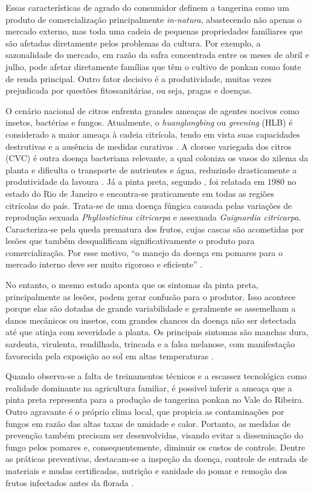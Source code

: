 Essas características de agrado do consumidor definem a tangerina como um produto de comercialização principalmente \emph{in-natura}, abastecendo não apenas o mercado externo, mas toda uma cadeia de pequenas propriedades familiares que são afetadas diretamente pelos problemas da cultura. Por exemplo, a sazonalidade do mercado, em razão da safra concentrada entre os meses de abril e julho, pode afetar diretamente famílias que têm o cultivo de ponkan como fonte de renda principal. Outro fator decisivo é a produtividade, muitas vezes prejudicada por questões fitossanitárias, ou seja, pragas e doenças. 

O cenário nacional de citros enfrenta grandes ameaças de agentes nocivos como insetos, bactérias e fungos. Atualmente, o \emph{huanglongbing} ou \emph{greening} (HLB) é considerado a maior ameaça à cadeia citrícola, tendo em vista suas capacidades destrutivas e a ausência de medidas curativas \cite{rodrigues2016hlb}. A clorose variegada dos citros (CVC) é outra doença bacteriana relevante, a qual coloniza os vasos do xilema da planta e dificulta o transporte de nutrientes e água, reduzindo drasticamente a produtividade da lavoura \cite{Alves2003}. Já a pinta preta, segundo \textcite{SilvaJunior2016}, foi relatada em 1980 no estado do Rio de Janeiro e encontra-se praticamente em todas as regiões citrícolas do país. Trata-se de uma doença fúngica causada pelas variações de reprodução sexuada \emph{Phyllostictina citricarpa} e assexuada \emph{Guignardia citricarpa}. Caracteriza-se pela queda prematura dos frutos, cujas cascas são acometidas por lesões que também desqualificam significativamente o produto para comercialização. Por esse motivo, “o manejo da doença em pomares para o mercado interno deve ser muito rigoroso e eficiente” \cite{SilvaJunior2016}.

No entanto, o mesmo estudo aponta que os sintomas da pinta preta, principalmente as lesões, podem gerar confusão para o produtor. Isso acontece porque elas são dotadas de grande variabilidade e geralmente se assemelham a danos mecânicos ou insetos, com grandes chances da doença não ser detectada até que atinja com severidade a planta. Os principais sintomas são manchas dura, sardenta, virulenta, rendilhada, trincada e a falsa melanose, com manifestação favorecida pela exposição ao sol em altas temperaturas \cite{SilvaJunior2016}.

Quando observa-se a falta de treinamentos técnicos e a escassez tecnológica como realidade dominante na agricultura familiar, é possível inferir a ameaça que a pinta preta representa para a produção de tangerina ponkan no Vale do Ribeira. Outro agravante é o próprio clima local, que propicia as contaminações por fungos em razão das altas taxas de umidade e calor. Portanto, as medidas de prevenção também precisam ser desenvolvidas, visando evitar a disseminação do fungo pelos pomares e, consequentemente, diminuir os custos de controle. Dentre as práticas preventivas, destacam-se a inspeção da doença, controle de entrada de materiais e mudas certificadas, nutrição e sanidade do pomar e remoção dos frutos infectados antes da florada \cite{Fundecitrus2025}.

